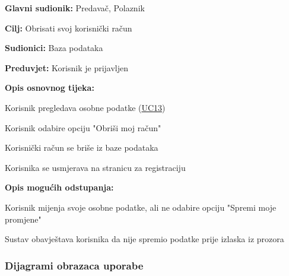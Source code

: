 			\begin{packed_item}
				
				\item \textbf{Glavni sudionik:} Predavač, Polaznik
				\item  \textbf{Cilj:} Obrisati svoj korisnički račun
				\item  \textbf{Sudionici:} Baza podataka
				\item  \textbf{Preduvjet:} Korisnik je prijavljen
				\item  \textbf{Opis osnovnog tijeka:}
				
				\item[] \begin{packed_enum}
					
					\item Korisnik pregledava osobne podatke (\hyperref[UC13] {UC13})
					\item Korisnik odabire opciju "Obriši moj račun"
					\item Korisnički račun se briše iz baze podataka
					\item Korisnika se usmjerava na stranicu za registraciju
					
				\end{packed_enum}
				\item  \textbf{Opis mogućih odstupanja:}
				
				\item[] \begin{packed_item}
					
					\item[2.a] Korisnik mijenja svoje osobne podatke, ali ne odabire opciju "Spremi moje promjene"
					\item[] \begin{packed_enum}
						
						\item Sustav obavještava korisnika da nije spremio podatke prije izlaska iz prozora
						
					\end{packed_enum}
					
				\end{packed_item}
			\eject
				
			\end{packed_item}
		
				\subsubsection{Dijagrami obrazaca uporabe}
					
